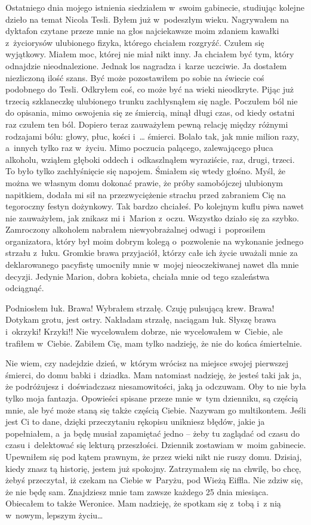 Ostatniego dnia mojego istnienia siedziałem w~swoim gabinecie, studiując kolejne dzieło na temat Nicola Tesli. Byłem już w~podeszłym wieku. Nagrywałem na dyktafon czytane przeze mnie na głos najciekawsze moim zdaniem kawałki z~życiorysów ulubionego fizyka, którego chciałem rozgryźć. Czułem się wyjątkowy. Miałem moc, której nie miał nikt inny. Ja chciałem być tym, który odnajdzie nieodnalezione. Jednak los nagradza i~karze uczciwie. Ja dostałem niezliczoną ilość szans. Być może pozostawiłem po sobie na świecie coś podobnego do Tesli. Odkryłem coś, co może być na wieki nieodkryte. Pijąc już trzecią szklaneczkę ulubionego trunku zachłysnąłem się nagle. Poczułem ból nie do opisania, mimo oswojenia się ze śmiercią, minął długi czas, od kiedy ostatni raz czułem ten ból. Dopiero teraz zauważyłem pewną relację między różnymi rodzajami bólu: głowy, płuc, kości i~… śmierci. Bolało tak, jak mnie milion razy, a~innych tylko raz w~życiu. Mimo poczucia palącego, zalewającego płuca alkoholu, wziąłem głęboki oddech i~odkaszlnąłem wyraziście, raz, drugi, trzeci. To było tylko zachłyśnięcie się napojem. Śmiałem się wtedy głośno. Myśl, że można we własnym domu dokonać prawie, że próby samobójczej ulubionym napitkiem, dodała mi sił na przezwyciężenie strachu przed zabraniem Cię na tegoroczny festyn dożynkowy. Tak bardzo chciałeś. Po kolejnym kuflu piwa nawet nie zauważyłem, jak znikasz mi i~Marion z~oczu. Wszystko działo się za szybko. Zamroczony alkoholem nabrałem niewyobrażalnej odwagi i~poprosiłem organizatora, który był moim dobrym kolegą o~pozwolenie na wykonanie jednego strzału z~łuku. Gromkie brawa przyjaciół, którzy całe ich życie uważali mnie za deklarowanego pacyfistę umocniły mnie w~mojej nieoczekiwanej nawet dla mnie decyzji. Jedynie Marion, dobra kobieta, chciała mnie od tego szaleństwa odciągnąć.

Podniosłem łuk. Brawa! Wybrałem strzałę. Czuję pulsującą krew. Brawa! Dotykam grotu, jest ostry. Nakładam strzałę, naciągam łuk. Słyszę brawa i~okrzyki! Krzyki!! Nie wycelowałem dobrze, nie wycelowałem w~Ciebie, ale trafiłem w~Ciebie. Zabiłem Cię, mam tylko nadzieję, że nie do końca śmiertelnie.

\paraSep

Nie wiem, czy nadejdzie dzień, w~którym wrócisz na miejsce swojej pierwszej śmierci, do domu babki i~dziadka. Mam natomiast nadzieję, że jesteś taki jak ja, że podróżujesz i~doświadczasz niesamowitości, jaką ja odczuwam. Oby to nie była tylko moja fantazja. Opowieści spisane przeze mnie w~tym dzienniku, są częścią mnie, ale być może staną się także częścią Ciebie. Nazywam go multikontem. Jeśli jest Ci to dane, dzięki przeczytaniu rękopisu unikniesz błędów, jakie ja popełniałem, a~ja będę musiał zapamiętać jedno – żeby tu zaglądać od czasu do czasu i~delektować się lekturą przeszłości. Dziennik zostawiam w~moim gabinecie. Upewniłem się pod kątem prawnym, że przez wieki nikt nie ruszy domu. Dzisiaj, kiedy znasz tą historię, jestem już spokojny. Zatrzymałem się na chwilę, bo chcę, żebyś przeczytał, iż czekam na Ciebie w~Paryżu, pod Wieżą Eiffla. Nie zdziw się, że nie będę sam. Znajdziesz mnie tam zawsze każdego 25 dnia miesiąca. Obiecałem to także Weronice. Mam nadzieję, że spotkam się z~tobą i~z nią w~nowym, lepszym życiu…
